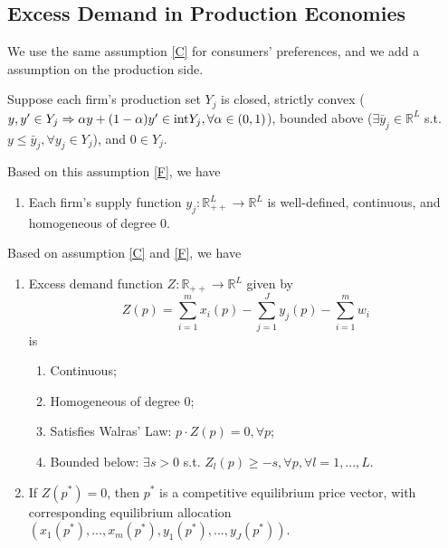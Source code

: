\documentclass[11pt]{elegantbook}
\begin{document}
\subsection{Excess Demand in Production Economies}
We use the same assumption \ref{C} for consumers' preferences, and we add a assumption on the production side.
\begin{assumption}\label{F}
    Suppose each firm's production set $Y_j$ is closed, strictly convex ($y,y'\in Y_j \Rightarrow \alpha y+(1-\alpha)y'\in \textnormal{int}Y_j, \forall \alpha\in (0,1)$), bounded above ($\exists \bar{y}_j\in \mathbb{R}^L$ s.t. $y\leq \bar{y}_j, \forall y_j\in Y_j$), and $0\in Y_j$.
\end{assumption}
Based on this assumption \ref{F}, we have
\begin{enumerate}[$\circ$]
    \item Each firm's supply function $y_j: \mathbb{R}_{++}^L \rightarrow \mathbb{R}^L$ is well-defined, continuous, and homogeneous of degree $0$.
\end{enumerate}
Based on assumption \ref{C} and \ref{F}, we have
\begin{enumerate}[$\circ$]
    \item Excess demand function $Z:\mathbb{R}_{++} \rightarrow \mathbb{R}^L$ given by $$Z(p)=\sum_{i=1}^m x_i(p)-\sum_{j=1}^Jy_j(p)-\sum_{i=1}^m w_i$$ is
    \begin{definition}[Condition (1) to (4)]
        \normalfont
        \begin{enumerate}[(1).]
            \item Continuous;
            \item Homogeneous of degree $0$;
            \item Satisfies Walras' Law: $p\cdot Z(p)=0, \forall p$;
            \item Bounded below: $\exists s>0$ s.t. $Z_l(p)\geq -s, \forall p, \forall l=1,...,L$.
        \end{enumerate}
    \end{definition}
    \item If $Z(p^*)=0$, then $p^*$ is a competitive equilibrium price vector, with corresponding equilibrium allocation $\left(x_1(p^*),...,x_m(p^*),y_1(p^*),...,y_J(p^*)\right)$.
\end{enumerate}
\end{document}
